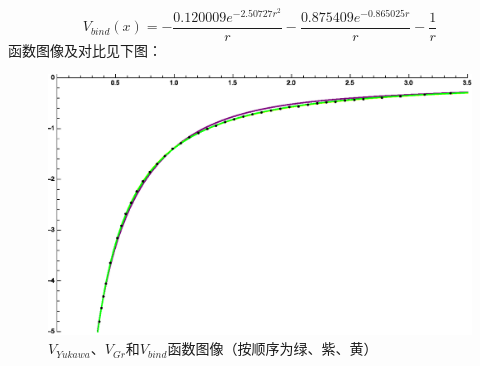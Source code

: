 \documentclass[hyperref]{ctexart}
\begin{document}
\begin{equation}\label{bind}
  V_{bind}(x)=-\frac{0.120009 e^{-2.50727 r^2}}{r}-\frac{0.875409 e^{-0.865025 r}}{r}-\frac{1}{r}
\end{equation}
函数图像及对比见下图：
\begin{figure}[!htbp]
  \centering
  \includegraphics[width=5.2in]{Test_BindingEnergy_FitOtherwise2.eps}
  \caption{$V_{Yukawa}$、$V_{Gr}$和$V_{bind}$函数图像（按顺序为绿、紫、黄）}
\end{figure}
\end{document}
